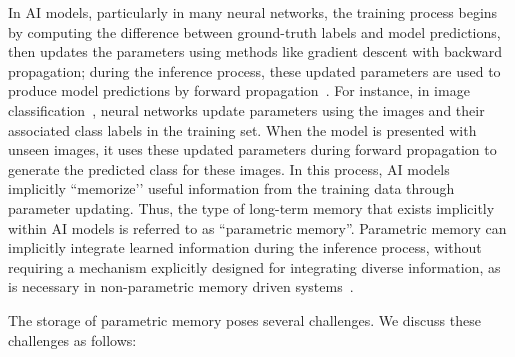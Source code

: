 \documentclass[journal,hideappendix]{vgtc}
\begin{document}
In AI models, particularly in many neural networks, the training process begins by computing the difference between ground-truth labels and model predictions, then updates the parameters using methods like gradient descent with backward propagation; during the inference process, these updated parameters are used to produce model predictions by forward propagation~\cite{lecun2015deep,bengio2017deep,kriegeskorte2019neural}. For instance, in image classification~\cite{lu2007survey}, neural networks update parameters using the images and their associated class labels in the training set. When the model is presented with unseen images, it uses these updated parameters during forward propagation to generate the predicted class for these images. 
In this process, AI models implicitly ``memorize’’ useful information from the training data through parameter updating.
Thus, the type of long-term memory that exists implicitly within AI models is referred to as ``parametric memory''. Parametric memory can implicitly integrate learned information during the inference process, without requiring a mechanism explicitly designed for integrating diverse information, as is necessary in non-parametric memory driven systems~\cite{heinzerlinginui2021language,yu2023generate}.

The storage of parametric memory poses several challenges. 
We discuss these challenges as follows:
\end{document}
